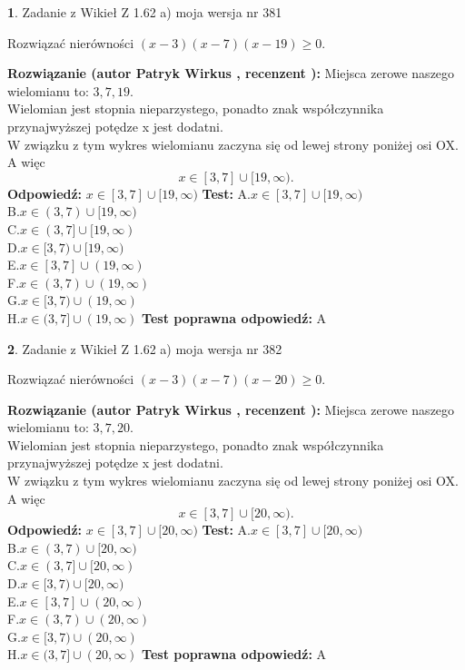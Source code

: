 \documentclass[12pt, a4paper]{article}
\theoremstyle{definition} %
\newtheorem{zad}{}
\newcommand{\zadStart}[1]{\begin{zad}#1\newline}
\newcommand{\zadStop}{\end{zad}}
\newcommand{\rozwStart}[2]{\noindent \textbf{Rozwiązanie (autor #1 , recenzent #2): }\newline}
\newcommand{\rozwStop}{\newline}
\newcommand{\odpStart}{\noindent \textbf{Odpowiedź:}\newline}
\newcommand{\odpStop}{\newline}
\newcommand{\testStart}{\noindent \textbf{Test:}\newline}
\newcommand{\testStop}{\newline}
\newcommand{\kluczStart}{\noindent \textbf{Test poprawna odpowiedź:}\newline}
\newcommand{\kluczStop}{\newline}
\begin{document}
\zadStart{Zadanie z Wikieł Z 1.62 a) moja wersja nr 381}

Rozwiązać nierówności $(x-3)(x-7)(x-19)\ge0$.
\zadStop
\rozwStart{Patryk Wirkus}{}
Miejsca zerowe naszego wielomianu to: $3, 7, 19$.\\
Wielomian jest stopnia nieparzystego, ponadto znak współczynnika przy\linebreak najwyższej potędze x jest dodatni.\\ W związku z tym wykres wielomianu zaczyna się od lewej strony poniżej osi OX. A więc $$x \in [3,7] \cup [19,\infty).$$
\rozwStop
\odpStart
$x \in [3,7] \cup [19,\infty)$
\odpStop
\testStart
A.$x \in [3,7] \cup [19,\infty)$\\
B.$x \in (3,7) \cup [19,\infty)$\\
C.$x \in (3,7] \cup [19,\infty)$\\
D.$x \in [3,7) \cup [19,\infty)$\\
E.$x \in [3,7] \cup (19,\infty)$\\
F.$x \in (3,7) \cup (19,\infty)$\\
G.$x \in [3,7) \cup (19,\infty)$\\
H.$x \in (3,7] \cup (19,\infty)$
\testStop
\kluczStart
A
\kluczStop



\zadStart{Zadanie z Wikieł Z 1.62 a) moja wersja nr 382}

Rozwiązać nierówności $(x-3)(x-7)(x-20)\ge0$.
\zadStop
\rozwStart{Patryk Wirkus}{}
Miejsca zerowe naszego wielomianu to: $3, 7, 20$.\\
Wielomian jest stopnia nieparzystego, ponadto znak współczynnika przy\linebreak najwyższej potędze x jest dodatni.\\ W związku z tym wykres wielomianu zaczyna się od lewej strony poniżej osi OX. A więc $$x \in [3,7] \cup [20,\infty).$$
\rozwStop
\odpStart
$x \in [3,7] \cup [20,\infty)$
\odpStop
\testStart
A.$x \in [3,7] \cup [20,\infty)$\\
B.$x \in (3,7) \cup [20,\infty)$\\
C.$x \in (3,7] \cup [20,\infty)$\\
D.$x \in [3,7) \cup [20,\infty)$\\
E.$x \in [3,7] \cup (20,\infty)$\\
F.$x \in (3,7) \cup (20,\infty)$\\
G.$x \in [3,7) \cup (20,\infty)$\\
H.$x \in (3,7] \cup (20,\infty)$
\testStop
\kluczStart
A
\kluczStop
\end{document}
